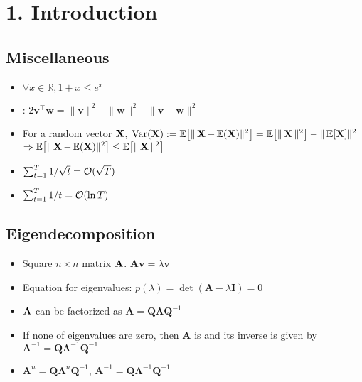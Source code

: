 \section*{1. Introduction}
\subsection*{Miscellaneous}
\begin{itemize}[leftmargin=*]
    \item $\forall x \in \mathbb{R}, 1+x \leq e^{x}$
    \item {}: $2 \mathbf{v}^{\top} \mathbf{w}=\|\mathbf{v}\|^{2}+\|\mathbf{w}\|^{2}-\|\mathbf{v}-\mathbf{w}\|^{2}$
    \item For a random vector $\operatorname{\boldsymbol{\mathbf{X}}}$, $\operatorname{Var}(\operatorname{\boldsymbol{\mathbf{X}}}) := \operatorname{\mathbb{E}} \bigl[ \|  \operatorname{\boldsymbol{\mathbf{X}}} - \operatorname{\mathbb{E}}(\operatorname{\boldsymbol{\mathbf{X}}}) \|^2\bigr] = \operatorname{\mathbb{E}}\bigl[\| \operatorname{\boldsymbol{\mathbf{X}}}\|^2\bigr] - \|\operatorname{\mathbb{E}}[\operatorname{\boldsymbol{\mathbf{X}}}]\|^2$
    $\Rightarrow \operatorname{\mathbb{E}} \bigl[ \|  \operatorname{\boldsymbol{\mathbf{X}}} - \operatorname{\mathbb{E}}(\operatorname{\boldsymbol{\mathbf{X}}}) \|^2\bigr] \leq \operatorname{\mathbb{E}}\bigl[\| \operatorname{\boldsymbol{\mathbf{X}}}\|^2\bigr] $
    \item $\sum_{t=1}^{T} 1/ \sqrt{t}= \operatorname{\mathcal{O}}(\sqrt{T})$
    \item $\sum_{t=1}^{T} 1/t= \operatorname{\mathcal{O}}(\ln T)$
\end{itemize}

\subsection*{Eigendecomposition}
\begin{itemize}[leftmargin=*]
    \item Square $n \times n$ matrix $\boldsymbol{\mathbf{A}}$. 
$\mathbf{A} \mathbf{v}=\lambda \mathbf{v}$
    \item Equation for eigenvalues:
$p(\lambda)=\operatorname{det}(\mathbf{A}-\lambda \mathbf{I})=0$
    \item $\boldsymbol{\mathbf{A}}$ can be factorized as $\mathbf{A}=\mathbf{Q}\mathbf{\Lambda}\mathbf{Q}^{-1}$
    \item If none of eigenvalues are zero, then $\mathbf{A}$ is  and its inverse is given by $\mathbf{A}^{-1}=\mathbf{Q} \mathbf{\Lambda}^{-1} \mathbf{Q}^{-1}$
    \item $\mathbf{A}^{n}=\mathbf{Q} \mathbf{\Lambda}^{n} \mathbf{Q}^{-1}$, $\mathbf{A}^{-1}=\mathbf{Q} \mathbf{\Lambda}^{-1} \mathbf{Q}^{-1}$
\end{itemize}


